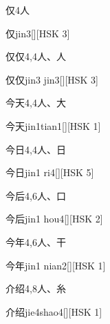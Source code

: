 \begin{entry}{仅}{4}{⼈}
  \begin{phonetics}{仅}{jin3}[][HSK 3]
  \end{phonetics}
\end{entry}

\begin{entry}{仅仅}{4,4}{⼈、⼈}
  \begin{phonetics}{仅仅}{jin3 jin3}[][HSK 3]
  \end{phonetics}
\end{entry}

\begin{entry}{今天}{4,4}{⼈、⼤}
  \begin{phonetics}{今天}{jin1tian1}[][HSK 1]
  \end{phonetics}
\end{entry}

\begin{entry}{今日}{4,4}{⼈、⽇}
  \begin{phonetics}{今日}{jin1 ri4}[][HSK 5]
  \end{phonetics}
\end{entry}

\begin{entry}{今后}{4,6}{⼈、⼝}
  \begin{phonetics}{今后}{jin1 hou4}[][HSK 2]
  \end{phonetics}
\end{entry}

\begin{entry}{今年}{4,6}{⼈、⼲}
  \begin{phonetics}{今年}{jin1 nian2}[][HSK 1]
  \end{phonetics}
\end{entry}

\begin{entry}{介绍}{4,8}{⼈、⽷}
  \begin{phonetics}{介绍}{jie4shao4}[][HSK 1]
  \end{phonetics}
\end{entry}

